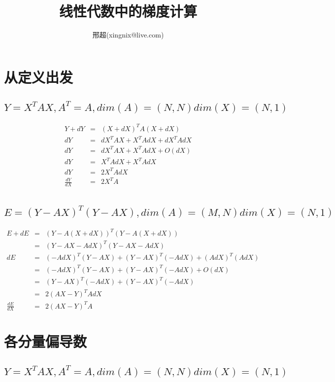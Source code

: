 \documentclass{article}
\begin{document}
\title{线性代数中的梯度计算}
\author{邢超(xingnix@live.com)}
\maketitle


\section{从定义出发}

\subsection{$Y=X^T A X , A^T=A,dim(A)=(N,N)dim(X)=(N,1)$}
\begin{eqnarray*}
	Y+dY &=&(X+dX)^T A (X+dX) \\
	dY &=& dX^T A X+X^T A dX+dX^T A dX \\
	dY &=& dX^T A X+X^T A dX+O(dX) \\
	dY &=&  X^T A dX+X^T A dX \\
	dY &=&  2 X^T A dX\\
	\frac{dY}{dX} &=&  2 X^T A \\
\end{eqnarray*}

\subsection{$E=(Y-AX)^T (Y-AX) , dim(A)=(M,N)dim(X)=(N,1)$}
\begin{eqnarray*}
E+dE &=& (Y-A(X+dX))^T(Y-A(X+dX)) \\
 &=& (Y-AX - A dX)^T(Y-AX - A dX) \\
dE &=& (- A dX)^T(Y-AX) + (Y-AX)^T (-A dX)  + (A dX)^T( A dX) \\
 &=& (- A dX)^T(Y-AX ) + (Y-AX )^T (-A dX)  + O(dX) \\
 &=& (Y-AX )^T(-A dX) + (Y-AX )^T (-A dX)  \\
 &=& 2(AX-Y)^T A dX \\
\frac{dE}{dX} &=& 2(AX-Y)^T A
\end{eqnarray*}

\section{各分量偏导数}

\subsection{$Y=X^T A X,A^T=A,dim(A)=(N,N)dim(X)=(N,1)$}
\end{document}
